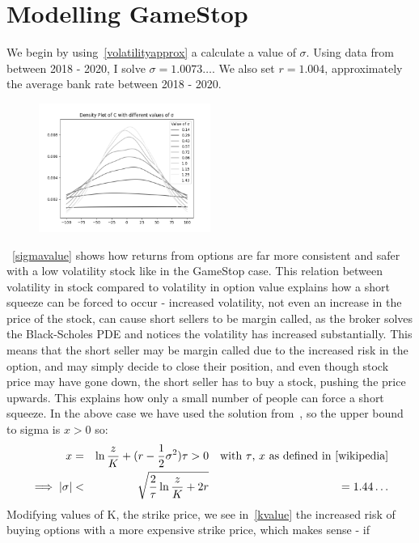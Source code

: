 \documentclass[11pt]{article} %
\begin{document}
\section{Modelling GameStop}
We begin by using~\eqref{volatilityapprox} a calculate a value of $\sigma$. Using data from
~\cite{nyse} between 2018 - 2020, I solve $\sigma = 1.0073\dots$. We also set 
$r=1.004$, approximately the average bank rate between 2018 - 2020.
\begin{figure}[h] 
    \centering
    \includegraphics[width=0.5\textwidth]{sigmavalue.png} 
    \caption[]{}\label{sigmavalue}
\end{figure}
~\eqref{sigmavalue} shows how returns from options are far more consistent and safer with a low volatility
stock like in the GameStop case. This relation between volatility in stock compared to 
volatility in option value explains how a short squeeze can be forced to occur - increased 
volatility, not even an increase in the price of the stock, can cause short sellers to be 
margin called, as the broker solves the Black-Scholes PDE and notices the volatility has 
increased substantially. This means that the short seller may be margin called due to 
the increased risk in the option, and may simply decide to close their position, and even though 
stock price may have gone down, the short seller has to buy a stock, pushing the price upwards. 
This explains how only a small number of people can force a short squeeze.
In the above case we have used the solution from~\cite{wikipedia}, 
 so the upper bound to sigma is $x>0$ so:
\begin{align}
    x =&& \ln{\frac{z}{K}} + (r - \frac{1}{2} \sigma^2)\tau > 0 && 
    \text{with $\tau$, $x$ as defined in~\cite{wikipedia}} \\
    \implies |\sigma| <&& \sqrt{\frac{2}{\tau} \ln{\frac{z}{K} + 2r}} && = 1.44\dots
\end{align}
Modifying values of K, the strike price, we see in~\eqref{kvalue} the increased risk 
of buying options with a more expensive strike price, which makes sense - if 
\end{document}
